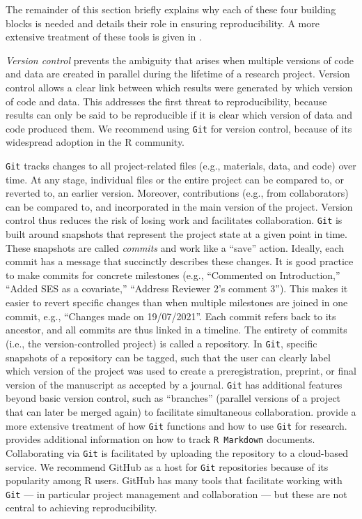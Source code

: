 \documentclass[psych,tutorial,submit,moreauthors,pdftex]{mdpi}
\begin{document}
The remainder of this section briefly explains why each of these four
building blocks is needed and details their role in ensuring
reproducibility. A more extensive treatment of these tools is given in
\citet{Peikert2019}.

\emph{Version control} prevents the ambiguity that arises when multiple
versions of code and data are created in parallel during the lifetime of
a research project. Version control allows a clear link between which
results were generated by which version of code and data. This addresses
the first threat to reproducibility, because results can only be said to
be reproducible if it is clear which version of data and code produced
them. We recommend using \texttt{Git} for version control, because of
its widespread adoption in the R community.

\texttt{Git} tracks changes to all project-related files (e.g.,
materials, data, and code) over time. At any stage, individual files or
the entire project can be compared to, or reverted to, an earlier
version. Moreover, contributions (e.g., from collaborators) can be
compared to, and incorporated in the main version of the project.
Version control thus reduces the risk of losing work and facilitates
collaboration. \texttt{Git} is built around snapshots that represent the
project state at a given point in time. These snapshots are called
\emph{commits} and work like a ``save'' action. Ideally, each commit has
a message that succinctly describes these changes. It is good practice
to make commits for concrete milestones (e.g., ``Commented on
Introduction,'' ``Added SES as a covariate,'' ``Address Reviewer 2's
comment 3''). This makes it easier to revert specific changes than when
multiple milestones are joined in one commit, e.g., ``Changes made on
19/07/2021''. Each commit refers back to its ancestor, and all commits
are thus linked in a timeline. The entirety of commits (i.e., the
version-controlled project) is called a repository. In \texttt{Git},
specific snapshots of a repository can be tagged, such that the user can
clearly label which version of the project was used to create a
preregistration, preprint, or final version of the manuscript as
accepted by a journal. \texttt{Git} has additional features beyond basic
version control, such as ``branches'' (parallel versions of a project
that can later be merged again) to facilitate simultaneous
collaboration. \citet{vuorreCuratingResearchAssets2018} provide a more
extensive treatment of how \texttt{Git} functions and how to use
\texttt{Git} for research. \citet{bryanExcuseMeYou2018} provides
additional information on how to track \texttt{R\ Markdown} documents.
Collaborating via \texttt{Git} is facilitated by uploading the
repository to a cloud-based service. We recommend GitHub as a host for
\texttt{Git} repositories because of its popularity among R users.
GitHub has many tools that facilitate working with \texttt{Git} --- in
particular project management and collaboration --- but these are not
central to achieving reproducibility.
\end{document}
